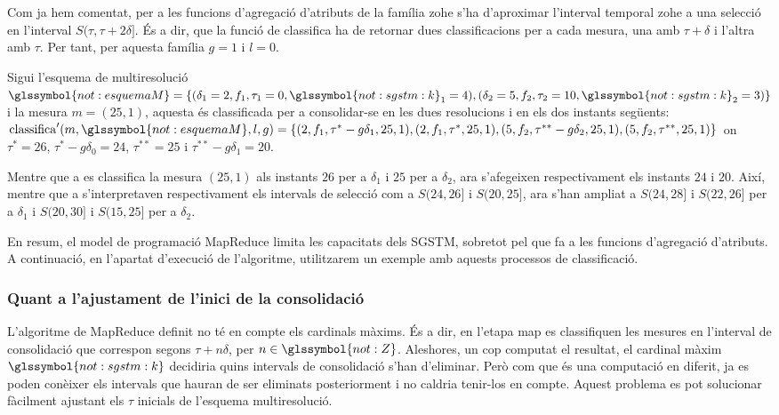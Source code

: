 \begin{example}
  \label{ex:mapreduce:fzohe} 
  Com ja hem comentat, per a les funcions d'agregació d'atributs de la
  família \gls{zohe} s'ha d'aproximar l'interval temporal \gls{zohe} a
  una selecció en l'interval $S(\tau,\tau+2\delta]$. És a dir, que
  la funció de classifica ha de retornar dues classificacions per a
  cada mesura, una amb $\tau+\delta$ i l'altra amb $\tau$. Per tant, per
  aquesta família $g=1$ i $l=0$.

  Sigui l'esquema de multiresolució
  $\glssymbol{not:esquemaM}=\{(\delta_1=2,f_1,\tau_1=0,
  \glssymbol{not:sgstm:k}_1=4), (\delta_2=5,f_2,
  \tau_2=10,\glssymbol{not:sgstm:k}_2=3)\}$ i la mesura $m=(25,1)$,
  aquesta és classificada per a consolidar-se en les dues resolucions
  i en els dos instants següents:
  $\operatorname{classifica}'(m,\glssymbol{not:esquemaM},l,g)=\{
  (2,f_1,\tau^*-g\delta_1,25,1), (2,f_1,\tau^*,25,1),
  (5,f_2,\tau^{**}-g\delta_2,25,1), (5,f_2,\tau^{**},25,1) \}$ on
  $\tau^*= 26$, $\tau^*-g\delta_0= 24$, $\tau^{**}= 25$ i
  $\tau^{**}-g\delta_1= 20$.  

  Mentre que a  es classifica la
  mesura $(25,1)$ als instants $26$ per a $\delta_1$ i $25$ per a
  $\delta_2$, ara s'afegeixen respectivament els instants $24$ i $20$.
  Així, mentre que a  s'interpretaven
  respectivament els intervals de selecció com a $S(24,26]$ i
  $S(20,25]$, ara s'han ampliat a $S(24,28]$ i $S(22,26]$ per a
  $\delta_1$ i  $S(20,30]$ i $S(15,25]$ per a $\delta_2$.
\end{example}



En resum, el model de programació MapReduce limita les capacitats dels
\gls{SGSTM}, sobretot pel que fa a les funcions d'agregació
d'atributs.  A continuació, en l'apartat d'execució de l'algoritme,
utilitzarem un exemple amb aquests processos de classificació.


\subsubsection{Quant a l'ajustament de l'inici de la consolidació}

L'algoritme de MapReduce definit no té en compte els cardinals màxims.
És a dir, en l'etapa map es classifiquen les mesures en l'interval de
consolidació que correspon segons $\tau+n\delta$, per
$n\in\glssymbol{not:Z}$.  Aleshores, un cop computat el resultat, el
cardinal màxim $\glssymbol{not:sgstm:k}$ decidiria quins intervals de
consolidació s'han d'eliminar.  Però com que és una computació en
diferit, ja es poden conèixer els intervals que hauran de ser
eliminats posteriorment i no caldria tenir-los en compte.  Aquest
problema es pot solucionar fàcilment ajustant els $\tau$ inicials de
l'esquema multiresolució.


